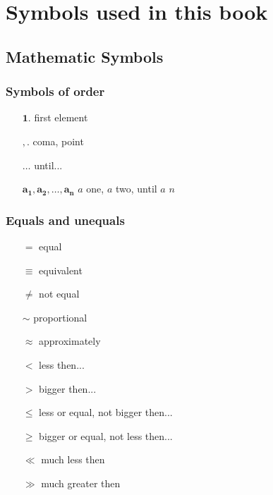 \section{Symbols used in this book}
\subsection{Mathematic Symbols}
\subsubsection{Symbols of order}
\begin{multicols}{2}
\begin{itemize}
\item[$\mathbf{1.}$] first element
\item[$\mathbf{, .}$] coma, point
\item[$\mathbf{\dots}$] until...
\item[$\mathbf{a_1,a_2,\dots ,a_n}$] $a$ one, $a$ two, until $a$ $n$
\end{itemize}
\end{multicols}
\subsubsection{Equals and unequals}
\begin{multicols}{2}
\begin{itemize}
\item[$\mathbf{=}$] equal
\item[$\mathbf{\equiv}$] equivalent
\item[$\mathbf{\ne}$] not equal
\item[$\mathbf{\sim}$] proportional
\item[$\mathbf{\approx}$] approximately
\item[$\mathbf{<}$] less then...
\item[$\mathbf{>}$] bigger then...
\item[$\mathbf{\leqslant}$] less or equal, not bigger then...
\item[$\mathbf{\geqslant}$] bigger or equal, not less then...
\item[$\mathbf{\ll}$] much less then
\item[$\mathbf{\gg}$] much greater then
\end{itemize}
\end{multicols}
